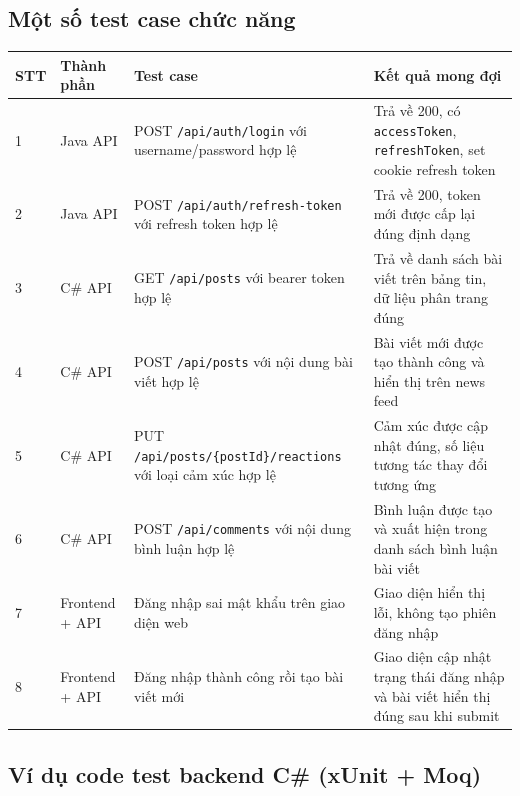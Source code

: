\documentclass[a4paper,12pt]{article}
\begin{document}
\subsection{Một số test case chức năng}
\begin{longtable}{|p{0.9cm}|p{2.8cm}|p{5cm}|p{5.3cm}|}
\hline
\textbf{STT} & \textbf{Thành phần} & \textbf{Test case} & \textbf{Kết quả mong đợi} \\
\hline
1 & Java API & POST \texttt{/api/auth/login} với username/password hợp lệ & Trả về 200, có \texttt{accessToken}, \texttt{refreshToken}, set cookie refresh token \\
\hline
2 & Java API & POST \texttt{/api/auth/refresh-token} với refresh token hợp lệ & Trả về 200, token mới được cấp lại đúng định dạng \\
\hline
3 & C\# API & GET \texttt{/api/posts} với bearer token hợp lệ & Trả về danh sách bài viết trên bảng tin, dữ liệu phân trang đúng \\
\hline
4 & C\# API & POST \texttt{/api/posts} với nội dung bài viết hợp lệ & Bài viết mới được tạo thành công và hiển thị trên news feed \\
\hline
5 & C\# API & PUT \texttt{/api/posts/\{postId\}/reactions} với loại cảm xúc hợp lệ & Cảm xúc được cập nhật đúng, số liệu tương tác thay đổi tương ứng \\
\hline
6 & C\# API & POST \texttt{/api/comments} với nội dung bình luận hợp lệ & Bình luận được tạo và xuất hiện trong danh sách bình luận bài viết \\
\hline
7 & Frontend + API & Đăng nhập sai mật khẩu trên giao diện web & Giao diện hiển thị lỗi, không tạo phiên đăng nhập \\
\hline
8 & Frontend + API & Đăng nhập thành công rồi tạo bài viết mới & Giao diện cập nhật trạng thái đăng nhập và bài viết hiển thị đúng sau khi submit \\
\hline
\end{longtable}

\subsection{Ví dụ code test backend C\# (xUnit + Moq)}
\end{document}
